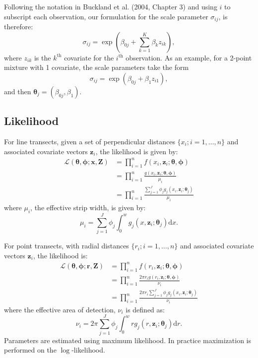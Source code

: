 \documentclass[useAMS,referee, usegraphicx]{biom}
\begin{document}
Following the notation in Buckland et al. (2004, Chapter 3) and using $i$ to subscript each observation, our formulation for the scale parameter $\sigma_{ij}$, is therefore:
\begin{equation*}
\sigma_{ij} = \exp( \beta_{0j} + \sum_{k=1}^K \beta_k z_{ik}),
\end{equation*}
where $z_{ik}$ is the $k^\text{th}$ covariate for the $i^\text{th}$ observation. As an example, for a 2-point mixture with 1 covariate, the scale parameters take the form
\begin{equation*}
\sigma_{ij} = \exp( \beta_{0j} + \beta_1 z_{i1}),
\end{equation*}
and then $\bm{\theta}_j = (\beta_{0j}, \beta_1)$. 


\subsection{Likelihood}

For line transects, given a set of perpendicular distances $\{x_i; i=1,\ldots,n\}$ and associated covariate vectors $\bm{z}_i$, the likelihood is given by:
\begin{align*}
\mathcal{L}(\bm{\theta},\bm{\phi}; \mathbf{x},\mathbf{Z}) &= \prod_{i=1}^n f(x_i,\bm{z}_i; \bm{\theta},\bm{\phi})\\
&= \prod_{i=1}^n \frac{g(x_i,\bm{z}_i; \bm{\theta},\bm{\phi})}{\mu_i}\\
&= \prod_{i=1}^n \frac{\sum_{j=1}^J \phi_j g_j(x_i,\bm{z}_i; \bm{\theta}_j)}{\mu_i}
\end{align*}
where $\mu_i$, the effective strip width, is given by:
\begin{equation*}
\mu_{i} = \sum_{j=1}^J \phi_j \int_0^w  g_j(x,\bm{z}_i; \bm{\theta}_j) \text{d}x.
\end{equation*}

For point transects, with radial distances $\{r_i; i=1,\ldots,n\}$ and associated covariate vectors $\bm{z}_i$, the likelihood is:
\begin{align*}
\mathcal{L}(\bm{\theta},\bm{\phi}; \mathbf{r},\mathbf{Z}) &= \prod_{i=1}^n f(r_i,\bm{z}_i; \bm{\theta},\bm{\phi})\\
&= \prod_{i=1}^n \frac{2 \pi r_i g(r_i,\bm{z}_i; \bm{\theta},\bm{\phi})}{\nu_i}\\
&= \prod_{i=1}^n \frac{2 \pi r_i \sum_{j=1}^J \phi_j g_j(x_i,\bm{z}_i; \bm{\theta}_j)}{\nu_i}
\end{align*}
where the effective area of detection, $\nu_i$ is defined as:
\begin{equation*}
\nu_i = 2\pi \sum_{j=1}^J \phi_j \int_0^w  r g_j(r,\bm{z}_i; \bm{\theta}_j) \text{d}r.
\end{equation*}
Parameters are estimated using maximum likelihood. In practice maximization is performed on the $\log$-likelihood.
\end{document}
